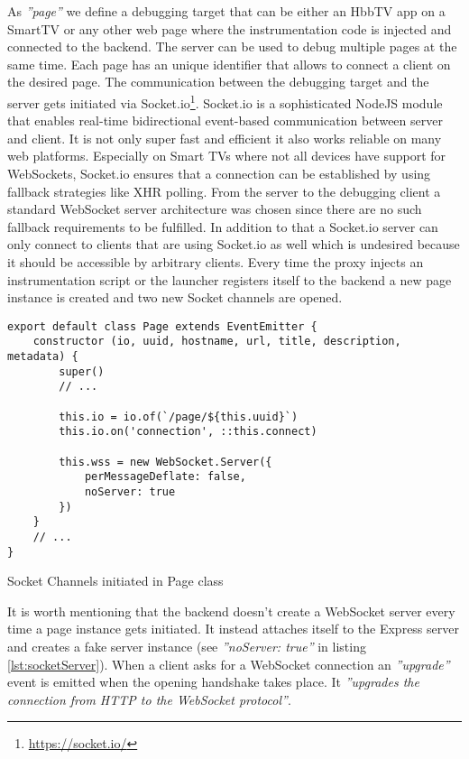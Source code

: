 As \textit{''page''} we define a debugging target that can be either an HbbTV app on a SmartTV or
any other web page where the instrumentation code is injected and connected to the backend. The
server can be used to debug multiple pages at the same time. Each page has an unique identifier
that allows to connect a client on the desired page. The communication between the debugging target
and the server gets initiated via Socket.io\footnote{\url{https://socket.io/}}. Socket.io is a
sophisticated NodeJS module that enables real-time bidirectional event-based communication between
server and client. It is not only super fast and efficient it also works reliable on many web
platforms. Especially on Smart TVs where not all devices have support for WebSockets, Socket.io
ensures that a connection can be established by using fallback strategies like XHR polling. From
the server to the debugging client a standard WebSocket server architecture was chosen since
there are no such fallback requirements to be fulfilled. In addition to that a Socket.io server
can only connect to clients that are using Socket.io as well which is undesired because it should
be accessible by arbitrary clients. Every time the proxy injects an instrumentation script or the
launcher registers itself to the backend a new page instance is created and two new Socket channels
are opened.

\begin{listing}[H]
\begin{verbatim}
export default class Page extends EventEmitter {
    constructor (io, uuid, hostname, url, title, description, metadata) {
        super()
        // ...

        this.io = io.of(`/page/${this.uuid}`)
        this.io.on('connection', ::this.connect)

        this.wss = new WebSocket.Server({
            perMessageDeflate: false,
            noServer: true
        })
    }
    // ...
}
\end{verbatim}
\caption{Socket Channels initiated in Page class}
\label{lst:socketServer}
\end{listing}

It is worth mentioning that the backend doesn't create a WebSocket server every time a page instance
gets initiated. It instead attaches itself to the Express server and creates a fake server instance
(see \textit{''noServer: true''} in listing \ref{lst:socketServer}). When a client asks for a WebSocket connection
an \textit{''upgrade''} event is emitted when the opening handshake takes place. It \textit{''upgrades
the connection from HTTP to the WebSocket protocol''}\cite{socket}.

